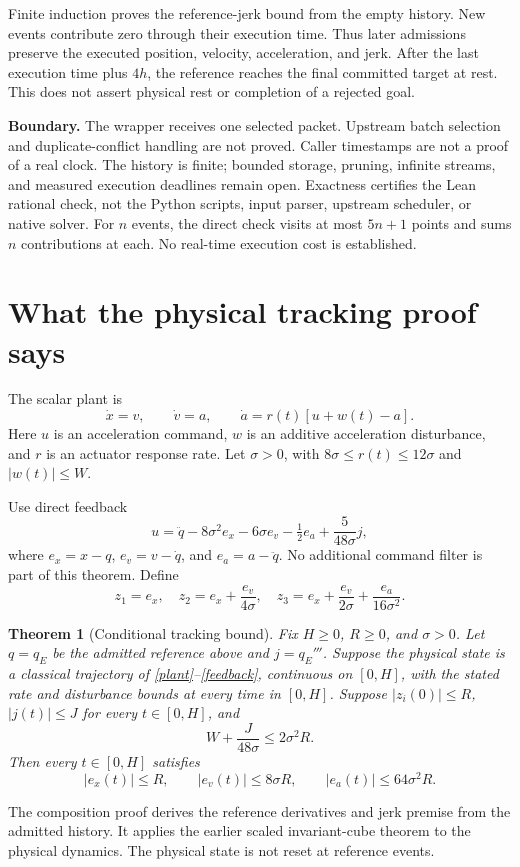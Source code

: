 \documentclass[11pt,letterpaper]{article}
\newtheorem{theorem}{Theorem}
\begin{document}
Finite induction proves the reference-jerk bound from the empty history. New events contribute zero through their execution time. Thus later admissions preserve the executed position, velocity, acceleration, and jerk. After the last execution time plus $4h$, the reference reaches the final committed target at rest. This does not assert physical rest or completion of a rejected goal.

\textbf{Boundary.} The wrapper receives one selected packet. Upstream batch selection and duplicate-conflict handling are not proved. Caller timestamps are not a proof of a real clock. The history is finite; bounded storage, pruning, infinite streams, and measured execution deadlines remain open. Exactness certifies the Lean rational check, not the Python scripts, input parser, upstream scheduler, or native solver. For $n$ events, the direct check visits at most $5n+1$ points and sums $n$ contributions at each. No real-time execution cost is established.

\newpage
\section{What the physical tracking proof says}
The scalar plant is
\begin{equation}\label{plant}
\dot x=v,\qquad \dot v=a,\qquad \dot a=r(t)[u+w(t)-a].
\end{equation}
Here $u$ is an acceleration command, $w$ is an additive acceleration disturbance, and $r$ is an actuator response rate. Let $\sigma>0$, with $8\sigma\leq r(t)\leq12\sigma$ and $|w(t)|\leq W$.

Use direct feedback
\begin{equation}\label{feedback}
u=\ddot q-8\sigma^2e_x-6\sigma e_v-\tfrac12e_a+\frac{5}{48\sigma}j,
\end{equation}
where $e_x=x-q$, $e_v=v-\dot q$, and $e_a=a-\ddot q$. No additional command filter is part of this theorem. Define
\[
z_1=e_x,\quad z_2=e_x+\frac{e_v}{4\sigma},\quad
z_3=e_x+\frac{e_v}{2\sigma}+\frac{e_a}{16\sigma^2}.
\]
\begin{theorem}[Conditional tracking bound]\label{tracking}
Fix $H\geq0$, $R\geq0$, and $\sigma>0$. Let $q=q_E$ be the admitted reference above and $j=q_E'''$. Suppose the physical state is a classical trajectory of \eqref{plant}--\eqref{feedback}, continuous on $[0,H]$, with the stated rate and disturbance bounds at every time in $[0,H]$. Suppose $|z_i(0)|\leq R$, $|j(t)|\leq J$ for every $t\in[0,H]$, and
\begin{equation}\label{budget}
W+\frac{J}{48\sigma}\leq2\sigma^2R.
\end{equation}
Then every $t\in[0,H]$ satisfies
\[
|e_x(t)|\leq R,\qquad |e_v(t)|\leq8\sigma R,\qquad
|e_a(t)|\leq64\sigma^2R.
\]
\end{theorem}
The composition proof derives the reference derivatives and jerk premise from the admitted history. It applies the earlier scaled invariant-cube theorem to the physical dynamics. The physical state is not reset at reference events.
\end{document}
